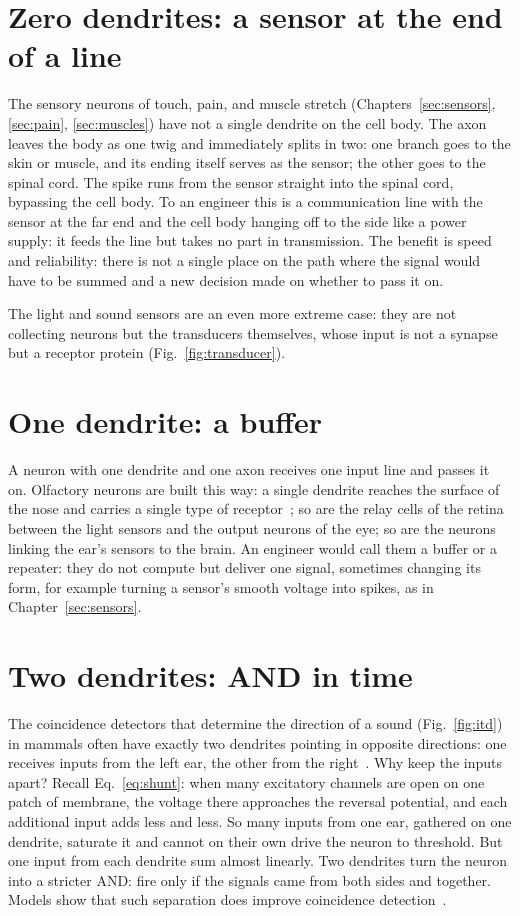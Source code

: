 \section{Zero dendrites: a sensor at the end of a line}

The sensory neurons of touch, pain, and muscle stretch (Chapters~\ref{sec:sensors}, \ref{sec:pain}, \ref{sec:muscles}) have not a single dendrite on the cell body. The axon leaves the body as one twig and immediately splits in two: one branch goes to the skin or muscle, and its ending itself serves as the sensor; the other goes to the spinal cord. The spike runs from the sensor straight into the spinal cord, bypassing the cell body. To an engineer this is a communication line with the sensor at the far end and the cell body hanging off to the side like a power supply: it feeds the line but takes no part in transmission. The benefit is speed and reliability: there is not a single place on the path where the signal would have to be summed and a new decision made on whether to pass it on.

The light and sound sensors are an even more extreme case: they are not collecting neurons but the transducers themselves, whose input is not a synapse but a receptor protein (Fig.~\ref{fig:transducer}).

\section{One dendrite: a buffer}

A neuron with one dendrite and one axon receives one input line and passes it on. Olfactory neurons are built this way: a single dendrite reaches the surface of the nose and carries a single type of receptor~\cite{Mombaerts2004}; so are the relay cells of the retina between the light sensors and the output neurons of the eye; so are the neurons linking the ear's sensors to the brain. An engineer would call them a buffer or a repeater: they do not compute but deliver one signal, sometimes changing its form, for example turning a sensor's smooth voltage into spikes, as in Chapter~\ref{sec:sensors}.

\section{Two dendrites: AND in time}

The coincidence detectors that determine the direction of a sound (Fig.~\ref{fig:itd}) in mammals often have exactly two dendrites pointing in opposite directions: one receives inputs from the left ear, the other from the right~\cite{Grothe2010}. Why keep the inputs apart? Recall Eq.~\eqref{eq:shunt}: when many excitatory channels are open on one patch of membrane, the voltage there approaches the reversal potential, and each additional input adds less and less. So many inputs from one ear, gathered on one dendrite, saturate it and cannot on their own drive the neuron to threshold. But one input from each dendrite sum almost linearly. Two dendrites turn the neuron into a stricter AND: fire only if the signals came from both sides and together. Models show that such separation does improve coincidence detection~\cite{AgmonSnir1998}.

